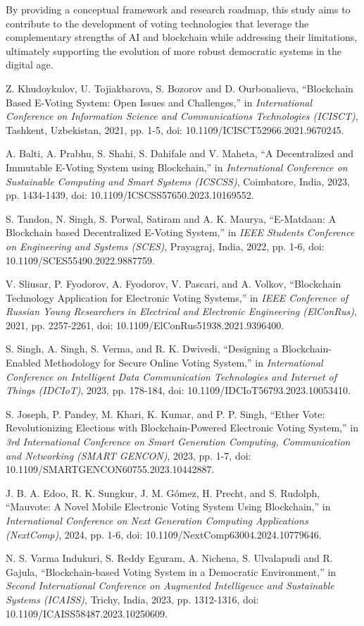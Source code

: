 \documentclass[conference]{IEEEtran}
\begin{document}
By providing a conceptual framework and research roadmap, this study aims to contribute to the development of voting technologies that leverage the complementary strengths of AI and blockchain while addressing their limitations, ultimately supporting the evolution of more robust democratic systems in the digital age.

\begin{thebibliography}{8}
Z. Khudoykulov, U. Tojiakbarova, S. Bozorov and D. Ourbonalieva, ``Blockchain Based E-Voting System: Open Issues and Challenges,'' in {\it International Conference on Information Science and Communications Technologies (ICISCT)}, Tashkent, Uzbekistan, 2021, pp. 1-5, doi: 10.1109/ICISCT52966.2021.9670245.

A. Balti, A. Prabhu, S. Shahi, S. Dahifale and V. Maheta, ``A Decentralized and Immutable E-Voting System using Blockchain,'' in {\it International Conference on Sustainable Computing and Smart Systems (ICSCSS)}, Coimbatore, India, 2023, pp. 1434-1439, doi: 10.1109/ICSCSS57650.2023.10169552.

S. Tandon, N. Singh, S. Porwal, Satiram and A. K. Maurya, ``E-Matdaan: A Blockchain based Decentralized E-Voting System,'' in {\it IEEE Students Conference on Engineering and Systems (SCES)}, Prayagraj, India, 2022, pp. 1-6, doi: 10.1109/SCES55490.2022.9887759.

V. Sliusar, P. Fyodorov, A. Fyodorov, V. Pascari, and A. Volkov, ``Blockchain Technology Application for Electronic Voting Systems,'' in {\it IEEE Conference of Russian Young Researchers in Electrical and Electronic Engineering (ElConRus)}, 2021, pp. 2257-2261, doi: 10.1109/ElConRus51938.2021.9396400.

S. Singh, A. Singh, S. Verma, and R. K. Dwivedi, ``Designing a Blockchain-Enabled Methodology for Secure Online Voting System,'' in {\it International Conference on Intelligent Data Communication Technologies and Internet of Things (IDCIoT)}, 2023, pp. 178-184, doi: 10.1109/IDCIoT56793.2023.10053410.

S. Joseph, P. Pandey, M. Khari, K. Kumar, and P. P. Singh, ``Ether Vote: Revolutionizing Elections with Blockchain-Powered Electronic Voting System,'' in {\it 3rd International Conference on Smart Generation Computing, Communication and Networking (SMART GENCON)}, 2023, pp. 1-7, doi: 10.1109/SMARTGENCON60755.2023.10442887.

J. B. A. Edoo, R. K. Sungkur, J. M. Gómez, H. Precht, and S. Rudolph, ``Mauvote: A Novel Mobile Electronic Voting System Using Blockchain,'' in {\it International Conference on Next Generation Computing Applications (NextComp)}, 2024, pp. 1-6, doi: 10.1109/NextComp63004.2024.10779646.

N. S. Varma Indukuri, S. Reddy Eguram, A. Nichena, S. Ulvalapudi and R. Gajula, ``Blockchain-based Voting System in a Democratic Environment,'' in {\it Second International Conference on Augmented Intelligence and Sustainable Systems (ICAISS)}, Trichy, India, 2023, pp. 1312-1316, doi: 10.1109/ICAISS58487.2023.10250609.
\end{thebibliography}
\end{document}
